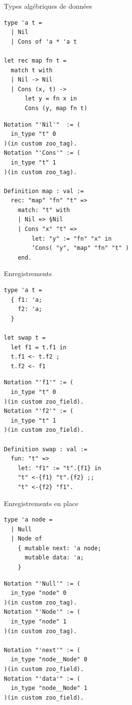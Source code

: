 \begin{frame}[fragile]{Types algébriques de données}
\begin{minipage}{0.49\textwidth}
  \begin{verbatim}
type 'a t =
  | Nil
  | Cons of 'a * 'a t

let rec map fn t =
  match t with
  | Nil -> Nil
  | Cons (x, t) ->
      let y = fn x in
      Cons (y, map fn t)
  \end{verbatim}
\end{minipage}
\begin{minipage}{0.5\textwidth}
  \begin{verbatim}
Notation "'Nil'"  := (
  in_type "t" 0
)(in custom zoo_tag).
Notation "'Cons'" := (
  in_type "t" 1
)(in custom zoo_tag).

Definition map : val :=
  rec: "map" "fn" "t" =>
    match: "t" with
    | Nil => §Nil
    | Cons "x" "t" =>
        let: "y" := "fn" "x" in
        ‘Cons( "y", "map" "fn" "t" )
    end.
  \end{verbatim}
\end{minipage}
\end{frame}

\begin{frame}[fragile]{Enregistrements}
\begin{minipage}{0.49\textwidth}
  \begin{verbatim}
type 'a t =
  { f1: 'a;
    f2: 'a;
  }

let swap t =
  let f1 = t.f1 in
  t.f1 <- t.f2 ;
  t.f2 <- f1
  \end{verbatim}
\end{minipage}
\begin{minipage}{0.5\textwidth}
  \begin{verbatim}
Notation "'f1'" := (
  in_type "t" 0
)(in custom zoo_field).
Notation "'f2'" := (
  in_type "t" 1
)(in custom zoo_field).

Definition swap : val :=
  fun: "t" =>
    let: "f1" := "t".{f1} in
    "t" <-{f1} "t".{f2} ;;
    "t" <-{f2} "f1".
  \end{verbatim}
\end{minipage}
\end{frame}

\begin{frame}[fragile]{Enregistrements en place}
\begin{minipage}{0.49\textwidth}
  \begin{verbatim}
type 'a node =
  | Null
  | Node of
    { mutable next: 'a node;
      mutable data: 'a;
    }
  \end{verbatim}
\end{minipage}
\begin{minipage}{0.5\textwidth}
  \begin{verbatim}
Notation "'Null'" := (
  in_type "node" 0
)(in custom zoo_tag).
Notation "'Node'" := (
  in_type "node" 1
)(in custom zoo_tag).

Notation "'next'" := (
  in_type "node__Node" 0
)(in custom zoo_field).
Notation "'data'" := (
  in_type "node__Node" 1
)(in custom zoo_field).
  \end{verbatim}
\end{minipage}
\end{frame}

